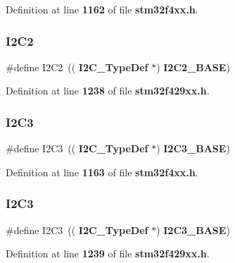 Definition at line \textbf{ 1162} of file \textbf{ stm32f4xx.\+h}.

\mbox{\label{group__Peripheral__declaration_gafa60ac20c1921ef1002083bb3e1f5d16}} 
\subsubsection{I2\+C2\hspace{0.1cm}{\footnotesize\ttfamily [2/2]}}
{\footnotesize\ttfamily \#define I2\+C2~((\textbf{ I2\+C\+\_\+\+Type\+Def} $\ast$) \textbf{ I2\+C2\+\_\+\+B\+A\+SE})}



Definition at line \textbf{ 1238} of file \textbf{ stm32f429xx.\+h}.

\mbox{\label{group__Peripheral__declaration_ga1489b37ed2bca9d9c659119590583bda}} 
\subsubsection{I2\+C3\hspace{0.1cm}{\footnotesize\ttfamily [1/2]}}
{\footnotesize\ttfamily \#define I2\+C3~((\textbf{ I2\+C\+\_\+\+Type\+Def} $\ast$) \textbf{ I2\+C3\+\_\+\+B\+A\+SE})}



Definition at line \textbf{ 1163} of file \textbf{ stm32f4xx.\+h}.

\mbox{\label{group__Peripheral__declaration_ga1489b37ed2bca9d9c659119590583bda}} 
\subsubsection{I2\+C3\hspace{0.1cm}{\footnotesize\ttfamily [2/2]}}
{\footnotesize\ttfamily \#define I2\+C3~((\textbf{ I2\+C\+\_\+\+Type\+Def} $\ast$) \textbf{ I2\+C3\+\_\+\+B\+A\+SE})}



Definition at line \textbf{ 1239} of file \textbf{ stm32f429xx.\+h}.

\mbox{\label{group__Peripheral__declaration_ga9efe6de71871a01dd38abcb229f30c02}} 
